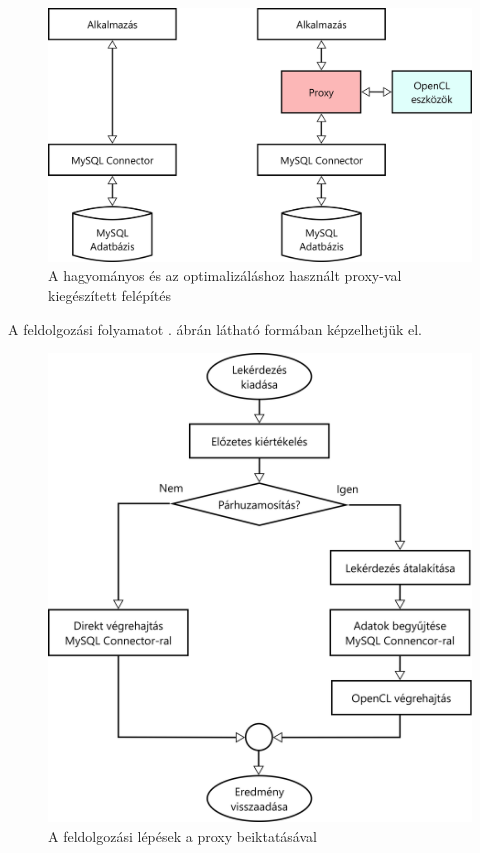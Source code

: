 \begin{figure}[h!]
\centering
\includegraphics[width=\textwidth]{images/proxy_arch.png}
\caption{A hagyományos és az optimalizáláshoz használt proxy-val kiegészített felépítés}
\label{fig:proxy_arch}
\end{figure}

A feldolgozási folyamatot . ábrán látható formában képzelhetjük el.

\begin{figure}[h!]
\centering
\includegraphics[width=\textwidth]{images/process.png}
\caption{A feldolgozási lépések a proxy beiktatásával}
\label{fig:process}
\end{figure}

